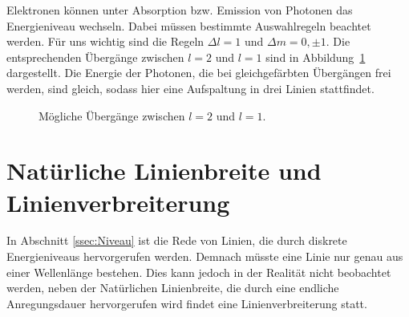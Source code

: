 Elektronen können unter Absorption bzw. Emission von Photonen das Energieniveau
wechseln. Dabei müssen bestimmte Auswahlregeln beachtet werden. Für uns wichtig
sind die Regeln $\Delta l = 1$ und $\Delta m = 0,\pm 1$. Die entsprechenden
Übergänge zwischen $l = 2$ und $l=1$ sind in Abbildung~\ref{fig:Übergänge}
dargestellt. Die Energie der Photonen, die bei gleichgefärbten Übergängen frei
werden, sind gleich, sodass hier eine Aufspaltung in drei Linien stattfindet.

\begin{figure}
    \centering

    \caption{%
        Mögliche Übergänge zwischen $l=2$ und $l=1$.
    }
    \label{fig:Übergänge}
\end{figure}

\section{Natürliche Linienbreite und Linienverbreiterung}

In Abschnitt \ref{ssec:Niveau} ist die Rede von Linien, die durch diskrete
Energieniveaus hervorgerufen werden. Demnach müsste eine Linie nur genau aus
einer Wellenlänge bestehen. Dies kann jedoch in der Realität nicht beobachtet
werden, neben der Natürlichen Linienbreite, die durch eine endliche
Anregungsdauer hervorgerufen wird findet eine Linienverbreiterung statt.

